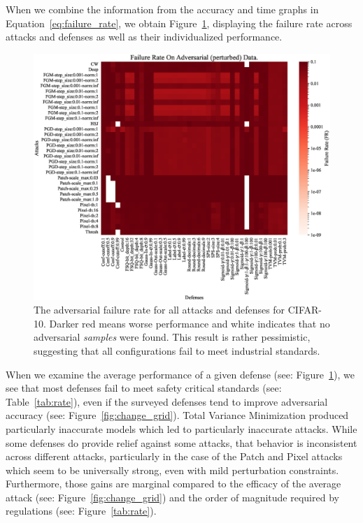 \documentclass[journal]{IEEEtran}
\newcommand{\cm}[1]{\textit{{\color{blue}#1}}}
\begin{document}
When we combine the information from the accuracy and time graphs in Equation~\ref{eq:failure_rate}, we obtain Figure~\ref{fig:rate_grid}, displaying the failure rate across attacks and defenses as well as their individualized performance.  
\begin{figure}[!hptb]
    {\centering
    \includegraphics[trim={0 0.85em 0 0.35em},clip,height=0.6\textwidth]{Fig15.eps}
    \vspace{-0.75em}
    \caption{The adversarial failure rate for all attacks and defenses for CIFAR-10. Darker red means worse performance and white indicates that no adversarial \cm{samples} were found. This result is rather pessimistic, suggesting that all configurations fail to meet industrial standards.}
    \label{fig:rate_grid}
    } %
\end{figure}
When we examine the average performance of a given defense (see: Figure~\ref{fig:rate_grid}), we see that most defenses fail to meet safety critical standards (see: Table~\ref{tab:rate}), even if the surveyed defenses tend to improve adversarial accuracy (see: Figure~\ref{fig:change_grid}). Total Variance Minimization produced particularly inaccurate models which led to particularly inaccurate attacks.  While some defenses do provide relief against some attacks, that behavior is inconsistent across different attacks, particularly in the case of the Patch and Pixel attacks which seem to be universally strong, even with mild perturbation constraints. Furthermore, those gains are marginal compared to the efficacy of the average attack (see: Figure~\ref{fig:change_grid}) and the order of magnitude required by regulations (see: Figure~\ref{tab:rate}).
\end{document}
